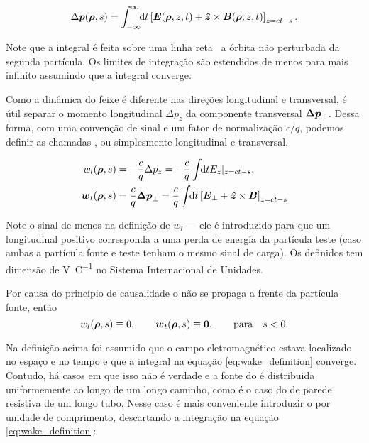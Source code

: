 \begin{equation}
 \Delta \vect{p}(\vect{\rho},s) = \defint{t}{\left[\vect{E}(\vect{\rho},z,t) + \vect{\hat{z}}\times \vect{B}(\vect{\rho},z,t)\right]_{z=ct-s}}{-\infty}{\infty}.
\end{equation}

Note que a integral é feita sobre uma linha reta \textemdash \, a órbita não perturbada da segunda partícula. Os limites de integração são estendidos de menos para mais infinito assumindo que a integral converge.

Como a dinâmica do feixe é diferente nas direções longitudinal e transversal, é útil separar o momento longitudinal $\Delta p_z$ da componente transversal $\vect{\Delta p}_\perp$. Dessa forma, com uma convenção de sinal e um fator de normalização $c/q$, podemos definir as chamadas , ou simplesmente  longitudinal e transversal,

\begin{equation}\label{eq:wake_definition}\begin{aligned}
    w_l(\vect{\rho},s) &= -\frac{c}{q} \Delta p_z = -\frac{c}{q} \udefint{t}{E_z|_{z=ct-s}}, \\
    \vect{w}_t(\vect{\rho},s) &= \frac{c}{q} \vect{\Delta p}_\perp = \frac{c}{q} \udefint{t}{\left[\vect{E}_\perp + \vect{\hat{z}}\times \vect{B}\right]_{z=ct-s}}
\end{aligned}\end{equation}

Note o sinal de menos na definição de $w_l$ --- ele é introduzido para que um  longitudinal positivo corresponda a uma perda de energia da partícula teste (caso ambas a partícula fonte e teste tenham o mesmo sinal de carga). Os  definidos tem dimensão de \si{\volt\per\coulomb} no Sistema Internacional de Unidades.

Por causa do princípio de causalidade o  não se propaga a frente da partícula fonte, então
\begin{equation}
    w_l(\vect{\rho},s) \equiv 0, \qquad \vect{w}_t(\vect{\rho},s) \equiv \vect{0}, \qquad \mathrm{para } \quad s < 0.
\end{equation}

Na definição acima foi assumido que o campo eletromagnético estava localizado no espaço e no tempo e que a integral na equação \ref{eq:wake_definition} converge. Contudo, há casos em que isso não é verdade e a fonte do  é distribuida uniformemente ao longo de um longo caminho, como é o caso do  de parede resistiva de um longo tubo. Nesse caso é mais conveniente introduzir o  por unidade de comprimento, descartando a integração na equação \ref{eq:wake_definition}:


